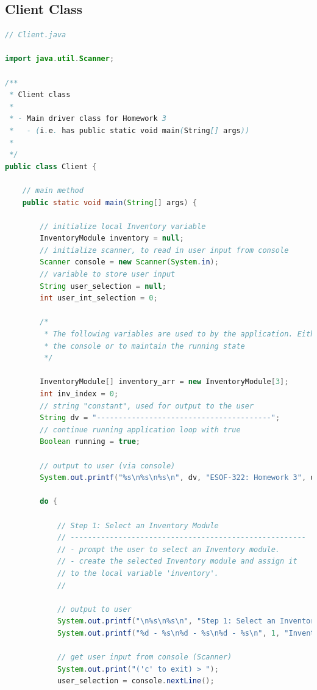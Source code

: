 \documentclass[12pt]{article}
\begin{document}
\subsection*{Client Class}
\begin{lstlisting}[language=Java]
// Client.java

import java.util.Scanner;

/**
 * Client class
 * 
 * - Main driver class for Homework 3
 *   - (i.e. has public static void main(String[] args))
 *   
 */
public class Client {

    // main method
    public static void main(String[] args) {

        // initialize local Inventory variable
        InventoryModule inventory = null;
        // initialize scanner, to read in user input from console
        Scanner console = new Scanner(System.in);
        // variable to store user input
        String user_selection = null;
        int user_int_selection = 0;

        /*
         * The following variables are used to by the application. Either for output to
         * the console or to maintain the running state
         */

        InventoryModule[] inventory_arr = new InventoryModule[3];
        int inv_index = 0;
        // string "constant", used for output to the user
        String dv = "----------------------------------------";
        // continue running application loop with true
        Boolean running = true;

        // output to user (via console)
        System.out.printf("%s\n%s\n%s\n", dv, "ESOF-322: Homework 3", dv);

        do {
            
            // Step 1: Select an Inventory Module
            // ------------------------------------------------------
            // - prompt the user to select an Inventory module.
            // - create the selected Inventory module and assign it
            // to the local variable 'inventory'.
            //

            // output to user
            System.out.printf("\n%s\n%s\n", "Step 1: Select an Inventory Module", dv);
            System.out.printf("%d - %s\n%d - %s\n%d - %s\n", 1, "Inventory1", 2, "Inventory2", 3, "Inventory3");

            // get user input from console (Scanner)
            System.out.print("('c' to exit) > ");
            user_selection = console.nextLine();


\end{lstlisting}
\end{document}
